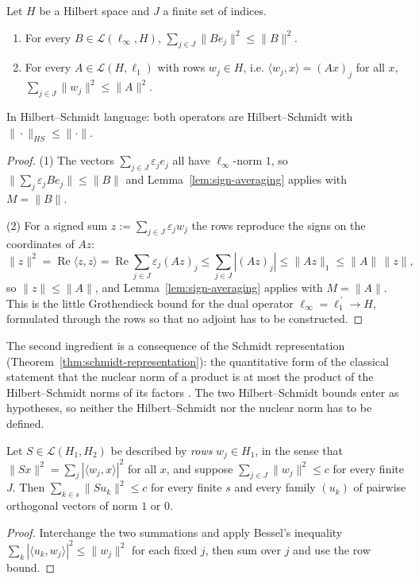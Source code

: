 \begin{lemma}
\label{lem:little-grothendieck}
\leanok
Let $H$ be a Hilbert space and $J$ a finite set of indices.
\begin{enumerate}
  \item For every $B \in \mathcal{L}(\ell_\infty, H)$,
    $\displaystyle \sum_{j \in J} \|B e_j\|^2 \le \|B\|^2$.
  \item For every $A \in \mathcal{L}(H, \ell_1)$ with rows $w_j \in H$, i.e.
    $\langle w_j, x\rangle = (A x)_j$ for all $x$,
    $\displaystyle \sum_{j \in J} \|w_j\|^2 \le \|A\|^2$.
\end{enumerate}
In Hilbert--Schmidt language: both operators are Hilbert--Schmidt with
$\|\cdot\|_{HS} \le \|\cdot\|$.
\end{lemma}
\begin{proof}
\leanok
{}
(1) The vectors $\sum_{j \in J} \varepsilon_j e_j$ all have $\ell_\infty$-norm
$1$, so $\|\sum_j \varepsilon_j B e_j\| \le \|B\|$ and
Lemma~\ref{lem:sign-averaging} applies with $M = \|B\|$.

(2) For a signed sum $z := \sum_{j \in J}\varepsilon_j w_j$ the rows reproduce
the signs on the coordinates of $A z$:
\[
  \|z\|^2 = \operatorname{Re}\langle z, z\rangle
          = \operatorname{Re} \sum_{j \in J} \varepsilon_j (A z)_j
          \le \sum_{j \in J} |(A z)_j| \le \|A z\|_1 \le \|A\|\,\|z\| ,
\]
so $\|z\| \le \|A\|$, and Lemma~\ref{lem:sign-averaging} applies with
$M = \|A\|$. This is the little Grothendieck bound for the dual operator
$\ell_\infty = \ell_1^{\,\prime} \to H$, formulated through the rows so that no
adjoint has to be constructed.
\end{proof}

The second ingredient is a consequence of the Schmidt representation
(Theorem~\ref{thm:schmidt-representation}): the quantitative form of the
classical statement that the nuclear norm of a product is at most the product
of the Hilbert--Schmidt norms of its factors \cite[2.11.23]{Pietsch87}. The
two Hilbert--Schmidt bounds enter as hypotheses, so neither the
Hilbert--Schmidt nor the nuclear norm has to be defined.

\begin{lemma}
\label{lem:bessel-rows}
\leanok
Let $S \in \mathcal{L}(H_1, H_2)$ be described by \emph{rows} $w_j \in H_1$, in
the sense that $\|S x\|^2 = \sum_j |\langle w_j, x\rangle|^2$ for all $x$, and
suppose $\sum_{j \in J} \|w_j\|^2 \le c$ for every finite $J$. Then
$\sum_{k \in s} \|S u_k\|^2 \le c$ for every finite $s$ and every family
$(u_k)$ of pairwise orthogonal vectors of norm $1$ or $0$.
\end{lemma}
\begin{proof}
\leanok
Interchange the two summations and apply Bessel's inequality
$\sum_k |\langle u_k, w_j\rangle|^2 \le \|w_j\|^2$ for each fixed $j$, then sum
over $j$ and use the row bound.
\end{proof}

